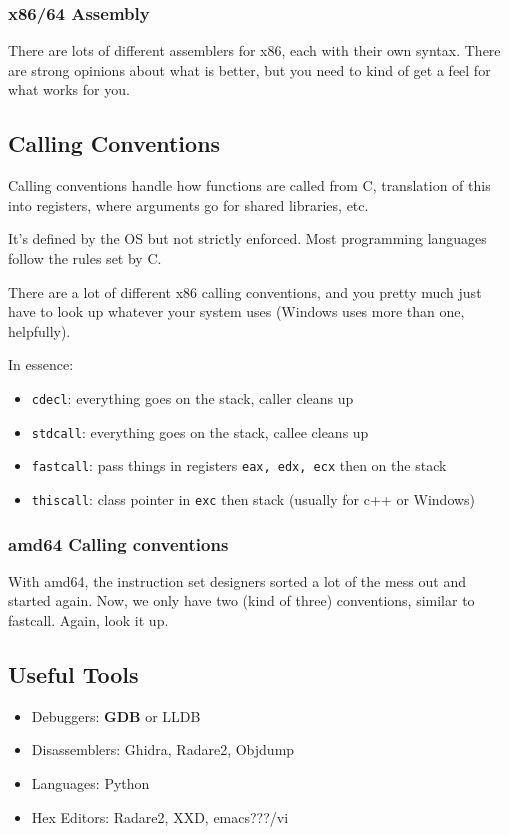 \documentclass[11pt,a4paper,titlepage,dvipsnames,cmyk]{scrartcl}
\begin{document}
\subsubsection{x86/64 Assembly}
There are lots of different assemblers for x86, each with their own syntax. There are strong opinions about what is better, but you need to kind of get a feel for what works for you.

\subsection{Calling Conventions}
Calling conventions handle how functions are called from C, translation of this into registers, where arguments go for shared libraries, etc.

It's defined by the OS but not strictly enforced. Most programming languages follow the rules set by C.

There are a lot of different x86 calling conventions, and you pretty much just have to look up whatever your system uses (Windows uses more than one, helpfully).

In essence:
\begin{itemize}
    \item \texttt{cdecl}: everything goes on the stack, caller cleans up
    \item \texttt{stdcall}: everything goes on the stack, callee cleans up
    \item \texttt{fastcall}: pass things in registers \texttt{eax, edx, ecx} then on the stack
    \item \texttt{thiscall}: class pointer in \texttt{exc} then stack (usually for c++ or Windows)
\end{itemize}

\subsubsection{amd64 Calling conventions}
With amd64, the instruction set designers sorted a lot of the mess out and started again. Now, we only have two (kind of three) conventions, similar to fastcall. Again, look it up.

\subsection{Useful Tools}
\begin{itemize}
    \item Debuggers: \textbf{GDB} or LLDB
    \item Disassemblers: Ghidra, Radare2, Objdump
    \item Languages: Python
    \item Hex Editors: Radare2, XXD, emacs???/vi
\end{itemize}
\end{document}
